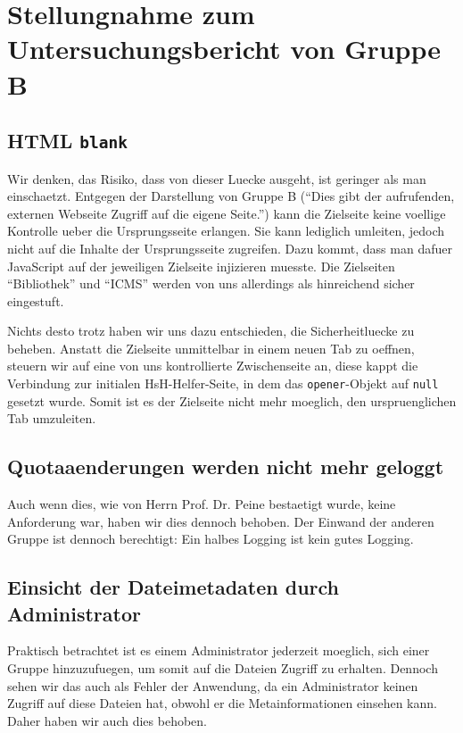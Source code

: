 \documentclass[12pt,DIV14,BCOR10mm,a4paper,parskip=half-,headsepline,headinclude,english,ngerman,bibliography=totocnumbered]{scrreprt}
\begin{document}
\vspace*{-3cm}

\tableofcontents  %

\chapter{Stellungnahme zum Untersuchungsbericht von Gruppe B}

\section{HTML \texttt{blank}}

Wir denken, das Risiko, dass von dieser Luecke ausgeht, ist geringer als man einschaetzt.
Entgegen der Darstellung von Gruppe B (\enquote{Dies gibt der aufrufenden, externen Webseite Zugriff auf die eigene Seite.}) kann die Zielseite keine voellige Kontrolle ueber die Ursprungsseite erlangen.
Sie kann lediglich umleiten, jedoch nicht auf die Inhalte der Ursprungsseite zugreifen.
Dazu kommt, dass man dafuer JavaScript auf der jeweiligen Zielseite injizieren muesste.
Die Zielseiten \enquote{Bibliothek} und \enquote{ICMS} werden von uns allerdings als hinreichend sicher eingestuft.

Nichts desto trotz haben wir uns dazu entschieden, die Sicherheitluecke zu beheben.
Anstatt die Zielseite unmittelbar in einem neuen Tab zu oeffnen, steuern wir auf eine von uns kontrollierte Zwischenseite an, diese kappt die Verbindung zur initialen HsH-Helfer-Seite, in dem das \texttt{opener}-Objekt auf \texttt{null} gesetzt wurde.
Somit ist es der Zielseite nicht mehr moeglich, den urspruenglichen Tab umzuleiten.

\section{Quotaaenderungen werden nicht mehr geloggt}

Auch wenn dies, wie von Herrn Prof. Dr. Peine bestaetigt wurde, keine Anforderung war, haben wir dies dennoch behoben.
Der Einwand der anderen Gruppe ist dennoch berechtigt: Ein halbes Logging ist kein gutes Logging.

\section{Einsicht der Dateimetadaten durch Administrator}

Praktisch betrachtet ist es einem Administrator jederzeit moeglich, sich einer Gruppe hinzuzufuegen, um somit auf die Dateien Zugriff zu erhalten.
Dennoch sehen wir das auch als Fehler der Anwendung, da ein Administrator keinen Zugriff auf diese Dateien hat, obwohl er die Metainformationen einsehen kann.
Daher haben wir auch dies behoben.
\end{document}
